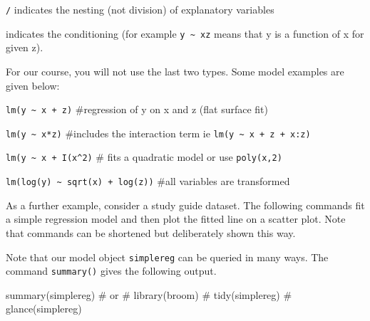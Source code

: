 \documentclass[
  letterpaper,
  DIV=11,
  numbers=noendperiod]{scrreprt}
\newenvironment{Shaded}{\begin{snugshade}}{\end{snugshade}}
\newcommand{\AttributeTok}[1]{\textcolor[rgb]{0.40,0.45,0.13}{#1}}
\newcommand{\CommentTok}[1]{\textcolor[rgb]{0.37,0.37,0.37}{#1}}
\newcommand{\ConstantTok}[1]{\textcolor[rgb]{0.56,0.35,0.01}{#1}}
\newcommand{\FunctionTok}[1]{\textcolor[rgb]{0.28,0.35,0.67}{#1}}
\newcommand{\NormalTok}[1]{\textcolor[rgb]{0.00,0.23,0.31}{#1}}
\newcommand{\OtherTok}[1]{\textcolor[rgb]{0.00,0.23,0.31}{#1}}
\newcommand{\SpecialCharTok}[1]{\textcolor[rgb]{0.37,0.37,0.37}{#1}}
\newcommand{\StringTok}[1]{\textcolor[rgb]{0.13,0.47,0.30}{#1}}
\begin{document}
\texttt{/} indicates the nesting (not division) of explanatory variables

\texttt{\textbar{}} indicates the conditioning (for example
\texttt{y\ \textasciitilde{}\ x\textbar{}z} means that y is a function
of x for given z).

For our course, you will not use the last two types. Some model examples
are given below:

\texttt{lm(y\ \textasciitilde{}\ x\ +\ z)} \#regression of y on x and z
(flat surface fit)

\texttt{lm(y\ \textasciitilde{}\ x*z)} \#includes the interaction term
ie \texttt{lm(y\ \textasciitilde{}\ x\ +\ z\ +\ x:z)}

\texttt{lm(y\ \textasciitilde{}\ x\ +\ I(x\^{}2)} \# fits a quadratic
model or use \texttt{poly(x,2)}

\texttt{lm(log(y)\ \textasciitilde{}\ sqrt(x)\ +\ log(z))} \#all
variables are transformed

As a further example, consider a study guide dataset. The following
commands fit a simple regression model and then plot the fitted line on
a scatter plot. Note that commands can be shortened but deliberately
shown this way.

\begin{Shaded}
\end{Shaded}

Note that our model object \texttt{simplereg} can be queried in many
ways. The command \texttt{summary()} gives the following output.

\begin{Shaded}
\begin{Highlighting}[]
\FunctionTok{summary}\NormalTok{(simplereg)}
\CommentTok{\# or}
\CommentTok{\# library(broom)}
\CommentTok{\# tidy(simplereg)}
\CommentTok{\# glance(simplereg)}
\end{Highlighting}
\end{Shaded}
\end{document}

